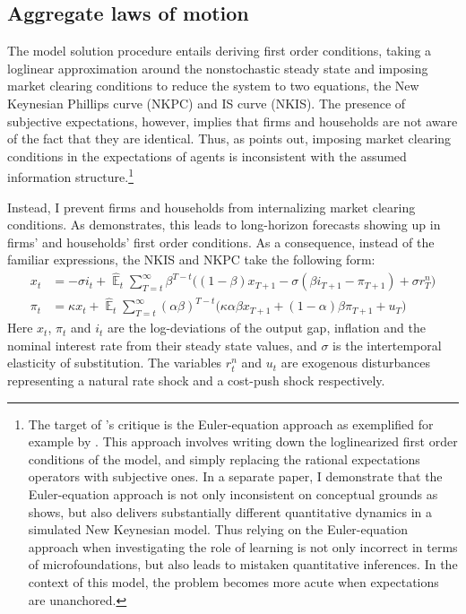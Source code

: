 \documentclass[11pt]{article}
\renewcommand{\[}{\begin{equation}}
\renewcommand{\]}{\end{equation}}
\DeclareMathOperator{\E}{\mathbb{E}}
\begin{document}
\subsection{Aggregate laws of motion}\label{FOCs}
The model solution procedure entails deriving first order conditions, taking a loglinear approximation around the nonstochastic steady state and imposing market clearing conditions to reduce the system to two equations, the New Keynesian Phillips curve (NKPC) and IS curve (NKIS). The presence of subjective expectations, however, implies that firms and households are not aware of the fact that they are identical. Thus, as \cite{preston2005} points out, imposing market clearing conditions in the expectations of agents is inconsistent with the assumed information structure.\footnote{The target of \cite{preston2005}'s critique is the Euler-equation approach as exemplified for example by \cite{bullard2002learning}. This approach involves writing down the loglinearized first order conditions of the model, and simply replacing the rational expectations operators with subjective ones. In a separate paper, I demonstrate that the Euler-equation approach is not only inconsistent on conceptual grounds as \cite{preston2005} shows, but also delivers substantially different quantitative dynamics in a simulated New Keynesian model. Thus relying on the Euler-equation approach when investigating the role of learning is not only incorrect in terms of microfoundations, but also leads to mistaken quantitative inferences. In the context of this model, the problem becomes more acute when expectations are unanchored.} 

Instead, I prevent firms and households from internalizing market clearing conditions. As \cite{preston2005} demonstrates, this leads to long-horizon forecasts showing up in firms' and households' first order conditions. As a consequence, instead of the familiar expressions, the NKIS and NKPC take the following form:
 \begin{align}
x_t &=  -\sigma i_t +\hat{\E}_t \sum_{T=t}^{\infty} \beta^{T-t }\big( (1-\beta)x_{T+1} - \sigma(\beta i_{T+1} - \pi_{T+1}) +\sigma r_T^n \big)  \label{NKIS}  \\
\pi_t &= \kappa x_t +\hat{\E}_t \sum_{T=t}^{\infty} (\alpha\beta)^{T-t }\big( \kappa \alpha \beta x_{T+1} + (1-\alpha)\beta \pi_{T+1} + u_T\big) \label{NKPC} 
\end{align}
Here $x_t$, $\pi_t$ and $i_t$ are the log-deviations of the output gap, inflation and the nominal interest rate from their steady state values, and $\sigma$ is the intertemporal elasticity of substitution. The variables $r_t^n$ and $u_t$ are exogenous disturbances representing a natural rate shock and a cost-push shock respectively. 
\end{document}
